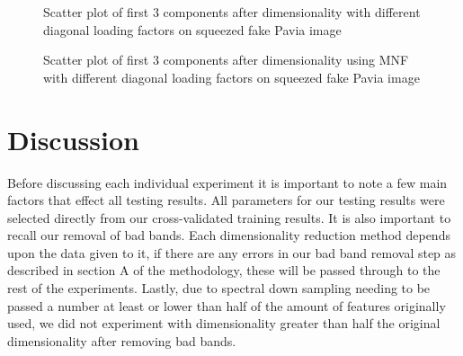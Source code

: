 \documentclass[conference,onecolumn]{IEEEtran}
\begin{document}
\begin{figure}[H]
	\centering
	\caption{Scatter plot of first 3 components after dimensionality with different diagonal loading factors on squeezed fake Pavia image}
	\label{sqPaviamnfdiag}
\end{figure}

\begin{figure}[H]
	\centering
	\caption{Scatter plot of first 3 components after dimensionality using MNF with different diagonal loading factors on squeezed fake Pavia image}
	\label{sqPaviamnfdiagScatter}
\end{figure}

\section{Discussion}
Before discussing each individual experiment it is important to note a few main factors that effect all testing results. All parameters for our testing results were selected directly from our cross-validated training results. It is also important to recall our removal of bad bands. Each dimensionality reduction method depends upon the data given to it, if there are any errors in our bad band removal step as described in section A of the methodology, these will be passed through to the rest of the experiments. Lastly, due to spectral down sampling needing to be passed a number at least or lower than half of the amount of features originally used, we did not experiment with dimensionality greater than half the original dimensionality after removing bad bands.
\end{document}
